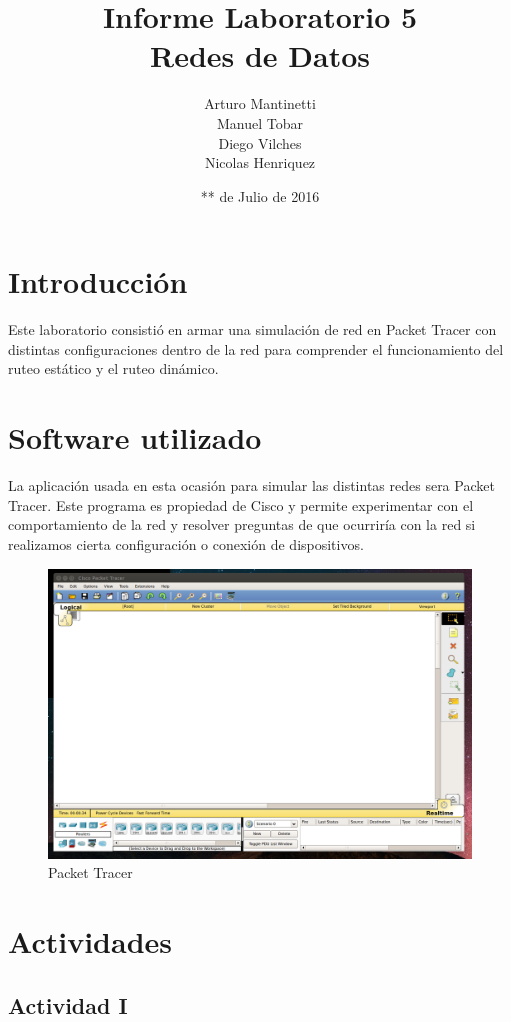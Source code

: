 \documentclass[spanish]{udpreport}
\title{Informe Laboratorio 5 \\ Redes de Datos}
\author{Arturo Mantinetti \\ Manuel Tobar \\ Diego Vilches \\ Nicolas Henriquez}
\date{** de Julio de 2016}
\begin{document}
\maketitle

\tableofcontents

\chapter{Introducción}

Este laboratorio consistió en armar una simulación de red en Packet Tracer con distintas configuraciones dentro de la red para comprender el funcionamiento del ruteo estático y el ruteo dinámico.

\chapter{Software utilizado}
La aplicación usada en esta ocasión para simular las distintas redes sera Packet Tracer. Este programa es propiedad de Cisco y permite experimentar con el comportamiento de la red y resolver preguntas de que ocurriría con la red si realizamos cierta configuración o conexión de dispositivos.

\begin{figure}[H]
	\centering
	\includegraphics[scale=.25]{imagenes/A0e.png}
	\caption{Packet Tracer}
	\label{fig:Figura 1.1}
\end{figure}


\chapter{Actividades}

\section{Actividad I}
\end{document}
